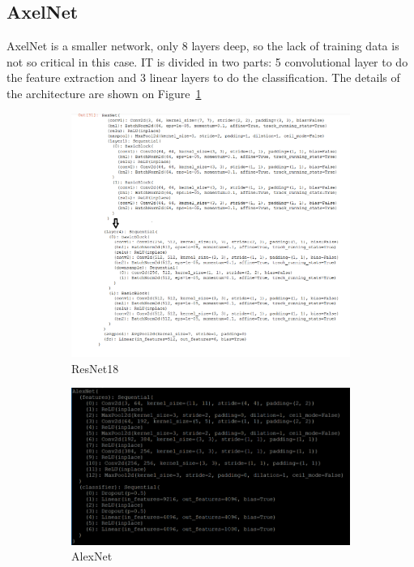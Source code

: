 \subsection{AxelNet}
AxelNet is a smaller network, only 8 layers deep, so the lack of training data is not so critical in this case. IT is divided in two parts: 5 convolutional layer to do the feature extraction and 3 linear layers to do the classification.  The details of the architecture are shown on Figure~\ref{fig:resarchi}
\begin{figure}
\begin{subfigure}{.5\textwidth}
  \centering
  \includegraphics[width=.8\linewidth]{./figures/03-Resnet_architecture}
  \caption{ResNet18}
  \label{fig:resarchi}
\end{subfigure}%
\begin{subfigure}{.5\textwidth}
  \centering
  \includegraphics[width=.8\linewidth]{./figures/03-alexnet_architecture}
  \caption{AlexNet}
  \label{fig:alexarchi}
\end{subfigure}
\begin{subfigure}{.5\textwidth}
  \centering

\end{subfigure}
\end{figure}
